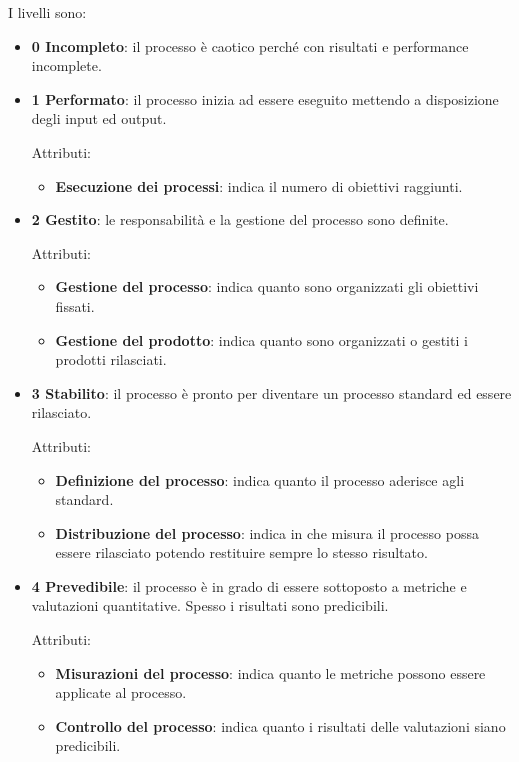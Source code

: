 	I livelli sono:
	
	\begin{itemize}
		\item \textbf{0 Incompleto}: il processo è caotico perché con risultati e performance incomplete.
	
		\item \textbf{1 Performato}: il processo inizia ad essere eseguito mettendo a disposizione degli input ed output.
		
		Attributi:
		
		\begin{itemize}
			\item \textbf{Esecuzione dei processi}: indica il numero di obiettivi raggiunti.
		\end{itemize}
	
		\item \textbf{2 Gestito}: le responsabilità e la gestione del processo sono definite.
		
		Attributi:
		
		\begin{itemize}
			\item \textbf{Gestione del processo}: indica quanto sono organizzati gli obiettivi fissati.
			\item \textbf{Gestione del prodotto}: indica quanto sono organizzati o gestiti i prodotti rilasciati.
		\end{itemize}
	
		\item \textbf{3 Stabilito}: il processo è pronto per diventare un processo standard ed essere rilasciato.
		
		Attributi:
		
		\begin{itemize}
			\item \textbf{Definizione del processo}: indica quanto il processo aderisce agli standard.
			\item \textbf{Distribuzione del processo}: indica in che misura il processo possa essere rilasciato potendo restituire sempre lo stesso risultato.
		\end{itemize}
	
		\item \textbf{4 Prevedibile}: il processo è in grado di essere sottoposto a metriche e valutazioni quantitative. Spesso i risultati sono predicibili.
		
		Attributi:
		
		\begin{itemize}
			\item \textbf{Misurazioni del processo}: indica quanto le metriche possono essere applicate al processo.
			\item \textbf{Controllo del processo}: indica quanto i risultati delle valutazioni siano predicibili.
		\end{itemize}
	

\end{itemize}
